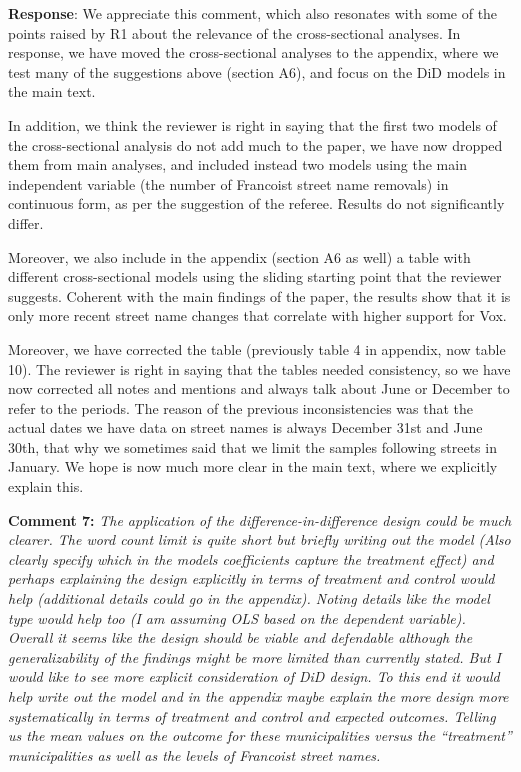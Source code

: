 \documentclass[12pt, a4paper, notitlepage]{article}
\begin{document}
\textbf{Response}: We appreciate this comment, which also resonates with some of the points raised by R1 about the relevance of the cross-sectional analyses. In response, we have moved the cross-sectional analyses to the appendix, where we test many of the suggestions above (section A6), and focus on the DiD models in the main text.

In addition, we think the reviewer is right in saying that the first two models of the cross-sectional analysis do not add much to the paper, we have now dropped them from main analyses, and included instead two models using the main independent variable (the number of Francoist street name removals) in continuous form, as per the suggestion of the referee. Results do not significantly differ.

Moreover, we also include in the appendix (section A6 as well) a table with different cross-sectional models using the sliding starting point that the reviewer suggests. Coherent with the main findings of the paper, the results show that it is only more recent street name changes that correlate with higher support for Vox.

Moreover, we have corrected the table (previously table 4 in appendix, now table 10). The reviewer is right in saying that the tables needed consistency, so we have now corrected all notes and mentions and always talk about June or December to refer to the periods. The reason of the previous inconsistencies was that the actual dates we have data on street names is always December 31st and June 30th, that why we sometimes said that we limit the samples following streets in January. We hope is now much more clear in the main text, where we explicitly explain this.

\textbf{Comment 7:} \textit{The application of the difference-in-difference design could be much clearer. The word count limit is quite short but briefly writing out the model (Also clearly specify which in the models coefficients capture the treatment effect) and perhaps explaining the design explicitly in terms of treatment and control would help (additional details could go in the appendix). Noting details like the model type would help too (I am assuming OLS based on the dependent variable). Overall it seems like the design should be viable and defendable although the generalizability of the findings might be more limited than currently stated. But I would like to see more explicit consideration of DiD design. To this end it would help write out the model and in the appendix maybe explain the more design more systematically in terms of treatment and control and expected outcomes. Telling us the mean values on the outcome for these municipalities versus the “treatment” municipalities as well as the levels of Francoist street names.}
\end{document}
